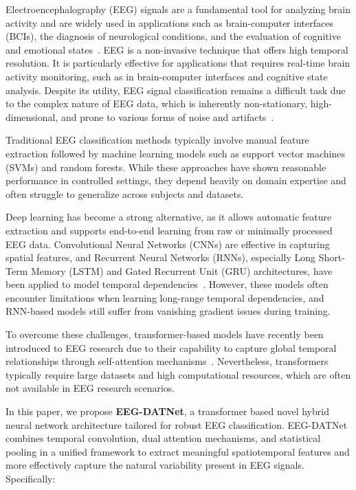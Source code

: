 \documentclass[pdflatex,sn-mathphys-num]{sn-jnl}%
\theoremstyle{thmstyleone}%
\theoremstyle{thmstyletwo}%
\theoremstyle{thmstylethree}%
\begin{document}
Electroencephalography (EEG) signals are a fundamental tool for analyzing brain activity and are widely used in applications such as brain-computer interfaces (BCIs), the diagnosis of neurological conditions, and the evaluation of cognitive and emotional states~\cite{roy2019deep}. EEG is a non-invasive technique that offers high temporal resolution. It is particularly effective for applications that requires real-time brain activity monitoring, such as in brain-computer interfaces and cognitive state analysis. Despite its utility, EEG signal classification remains a difficult task due to the complex nature of EEG data, which is inherently non-stationary, high-dimensional, and prone to various forms of noise and artifacts~\cite{lotte2018review}.

Traditional EEG classification methods typically involve manual feature extraction followed by machine learning models such as support vector machines (SVMs) and random forests. While these approaches have shown reasonable performance in controlled settings, they depend heavily on domain expertise and often struggle to generalize across subjects and datasets.

Deep learning has become a strong alternative, as it allows automatic feature extraction and supports end-to-end learning from raw or minimally processed EEG data. Convolutional Neural Networks (CNNs) are effective in capturing spatial features, and Recurrent Neural Networks (RNNs), especially Long Short-Term Memory (LSTM) and Gated Recurrent Unit (GRU) architectures, have been applied to model temporal dependencies~\cite{craik2019deep}. However, these models often encounter limitations when learning long-range temporal dependencies, and RNN-based models still suffer from vanishing gradient issues during training.

To overcome these challenges, transformer-based models have recently been introduced to EEG research due to their capability to capture global temporal relationships through self-attention mechanisms~\cite{vafaei2025transformers}. Nevertheless, transformers typically require large datasets and high computational resources, which are often not available in EEG research scenarios.

In this paper, we propose \textbf{EEG-DATNet}, a transformer based novel hybrid neural network architecture tailored for robust EEG classification. EEG-DATNet combines temporal convolution, dual attention mechanisms, and statistical pooling in a unified framework to extract meaningful spatiotemporal features and more effectively capture the natural variability present in EEG signals. Specifically:
\end{document}
